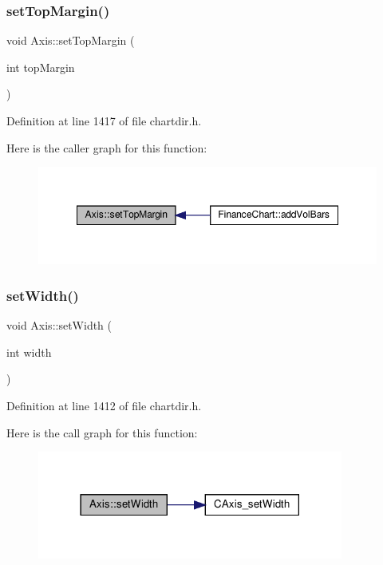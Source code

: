 \subsubsection{\texorpdfstring{set\+Top\+Margin()}{setTopMargin()}}
{\footnotesize\ttfamily void Axis\+::set\+Top\+Margin (\begin{DoxyParamCaption}\item[{int}]{top\+Margin }\end{DoxyParamCaption})\hspace{0.3cm}{\ttfamily [inline]}}



Definition at line 1417 of file chartdir.\+h.

Here is the caller graph for this function\+:
\nopagebreak
\begin{figure}[H]
\begin{center}
\leavevmode
\includegraphics[width=348pt]{class_axis_a05d760c8d314d23ba72ca69bf1382186_icgraph}
\end{center}
\end{figure}
\mbox{\label{class_axis_ab25fcf30198a480edcd5f2013d2376f1}} 
\subsubsection{\texorpdfstring{set\+Width()}{setWidth()}}
{\footnotesize\ttfamily void Axis\+::set\+Width (\begin{DoxyParamCaption}\item[{int}]{width }\end{DoxyParamCaption})\hspace{0.3cm}{\ttfamily [inline]}}



Definition at line 1412 of file chartdir.\+h.

Here is the call graph for this function\+:
\nopagebreak
\begin{figure}[H]
\begin{center}
\leavevmode
\includegraphics[width=285pt]{class_axis_ab25fcf30198a480edcd5f2013d2376f1_cgraph}
\end{center}
\end{figure}
\mbox{\label{class_axis_a27bf2d4b4c44ecf49e1ba7aad25bb897}} 
